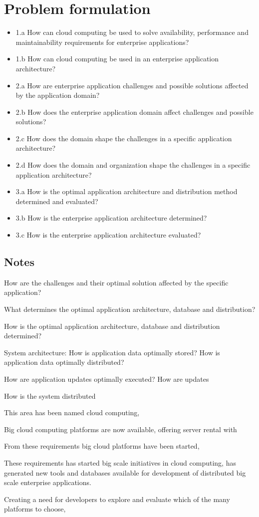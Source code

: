 \section{Problem formulation}
\label{sc:problem_formulation}

\begin{itemize}  
\item 1.a How can cloud computing be used to solve availability, performance and maintainability requirements for enterprise applications?
\item 1.b How can cloud computing be used in an enterprise application architecture?

\item 2.a How are enterprise application challenges and possible solutions affected by the application domain?
\item 2.b How does the enterprise application domain affect challenges and possible solutions?
\item 2.c How does the domain shape the challenges in a specific application architecture?
\item 2.d How does the domain and organization shape the challenges in a specific application architecture?

\item 3.a How is the optimal application architecture and distribution method determined and evaluated?
\item 3.b How is the enterprise application architecture determined?
\item 3.c How is the enterprise application architecture evaluated?
\end{itemize}

\subsection*{Notes}
How are the challenges and their optimal solution affected by the specific application?

What determines the optimal application architecture, database and distribution?

How is the optimal application architecture, database and distribution determined?

System architecture:
How is application data optimally stored?
How is application data optimally distributed?

How are application updates optimally executed?
How are updates 

How is the system distributed

This area has been named cloud computing, 

Big cloud computing platforms are now available, offering server rental with 

From these requirements big cloud platforms have been started, 

These requirements has started big scale initiatives in cloud computing, has generated new tools and databases available for development of distributed big scale enterprise applications. 

Creating a need for developers to explore and evaluate which of the many platforms to choose, 